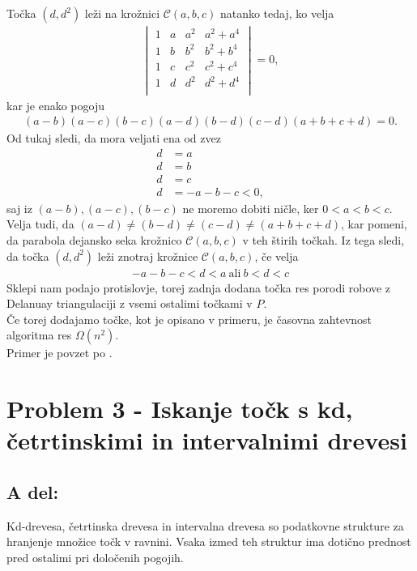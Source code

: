 \documentclass[a4paper,11pt]{article}
\begin{document}
Točka $(d, d^2)$ leži na krožnici $\mathcal{C}(a, b, c)$ natanko tedaj, ko velja
\begin{align*}
    \begin{vmatrix}
        1 & a & a^2 & a^2 + a^4 \\
        1 & b & b^2 & b^2 + b^4 \\
        1 & c & c^2 & c^2 + c^4 \\
        1 & d & d^2 & d^2 + d^4 \\
    \end{vmatrix}
    = 0,
\end{align*}
kar je enako pogoju
\begin{align*}
    (a - b)(a - c)(b - c)(a - d)(b - d)(c - d)(a + b + c + d) = 0.
\end{align*}
Od tukaj sledi, da mora veljati ena od zvez
\begin{align*}
    d &= a \\
    d &= b \\
    d &= c \\
    d &= - a - b - c < 0,
\end{align*}
saj iz $(a - b), (a - c), (b - c)$ ne moremo dobiti ničle, ker $0 < a < b < c$.
Velja tudi, da $(a - d) \neq (b - d) \neq (c - d) \neq (a + b + c + d)$, kar pomeni, da parabola dejansko seka krožnico $\mathcal{C}(a, b, c)$ v teh štirih točkah. 
Iz tega sledi, da točka $(d, d^2)$ leži znotraj krožnice $\mathcal{C}(a, b, c)$, če velja
\begin{align*}
    - a - b - c < d < a  \ 
    \text{ali}
    \ 
    b < d < c
\end{align*}    
Sklepi nam podajo protislovje, torej zadnja dodana točka res porodi robove z Delanuay triangulaciji z vsemi ostalimi točkami v $P$.
\\
Če torej dodajamo točke, kot je opisano v primeru, je časovna zahtevnost algoritma res $\Omega(n^2)$.
\\
Primer je povzet po \cite{stack}.

\section*{Problem 3 - Iskanje točk s kd, četrtinskimi in intervalnimi drevesi}

\subsection*{A del:}
Kd-drevesa, četrtinska drevesa in intervalna drevesa so podatkovne strukture za hranjenje množice točk v ravnini. 
Vsaka izmed teh struktur ima dotično prednost pred ostalimi pri določenih pogojih.
\end{document}
